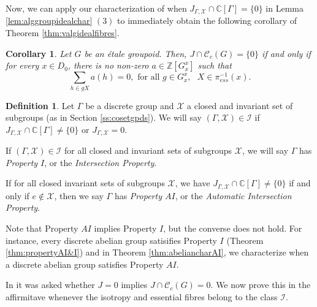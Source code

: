\documentclass[a4paper, 12pt]{amsart}
\newtheorem{cor}[thm]{Corollary}
\theoremstyle{definition}
\newtheorem{dfn}[thm]{Definition}
\theoremstyle{remark}
\numberwithin{equation}{section}
\begin{document}
Now, we can apply our characterization of when $J_{\Gamma,\mathcal{X}}\cap\mathbb{C}[\Gamma] = \{0\}$ in Lemma \ref{lem:alggroupidealchar} $(3)$ to immediately obtain the following corollary of Theorem \ref{thm:valgidealfibres}.

\begin{cor}
\label{cor:valgidealcharspan}
    Let $G$ be an \'etale groupoid. Then, $J\cap\mathscr{C}_{c}(G) = \{0\}$ if and only if for every $x\in D_{0}$, there is no non-zero $a\in\mathbb{Z}[G^{x}_{x}]$ such that
    $$\sum_{h\in gX}a(h) = 0,\text{ for all }g\in G^{x}_{x},\text{ }X\in\pi^{-1}_{ess}(x).$$
\end{cor}
\begin{dfn}
\label{dfn:I&AI}
    Let $\Gamma$ be a discrete group and $\mathcal{X}$ a closed and invariant set of subgroups (as in Section \ref{ss:cosetgpds}). We will say $(\Gamma, \mathcal{X})\in \mathcal{I}$ if $J_{\Gamma,\mathcal{X}}\cap\mathbb{C}[\Gamma]\neq \{0\}$ or $J_{\Gamma,\mathcal{X}} = 0$.

    If $(\Gamma, \mathcal{X})\in \mathcal{I}$ for all closed and invariant sets of subgroups $\mathcal{X}$, we will say $\Gamma$ has \emph{Property $I$}, or the \emph{Intersection Property}.

    If for all closed invariant sets of subgroups $\mathcal{X}$, we have $J_{\Gamma,\mathcal{X}}\cap\mathbb{C}[\Gamma]\neq \{0\}$ if and only if $e\notin \mathcal{X}$, then we say $\Gamma$ has \emph{Property $AI$}, or the \emph{Automatic Intersection Property}.
\end{dfn}

Note that Property $AI$ implies Property $I$, but the converse does not hold. For instance, every discrete abelian group satisifies Property $I$ (Theorem \ref{thm:propertyAI&I}) and in Theorem \ref{thm:abeliancharAI}, we characterize when a discrete abelian group satisfies Property $AI$.

In \cite[Questions~4.11]{BGHL25} it was asked whether $J =0$ implies $J\cap\mathscr{C}_{c}(G) = 0$. We now prove this in the affirmitave whenever the isotropy and essential fibres belong to the class $\mathcal{I}$.
\end{document}

